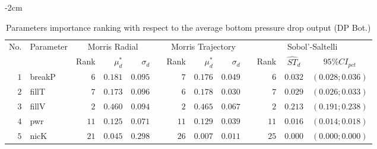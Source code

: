 \begin{table*}[!htbp]\centering
{}
\begin{adjustwidth*}{}{-2cm}
\caption{Parameters importance ranking with respect to the average bottom pressure drop output (DP Bot.)}
\label{tab:app_screening_dpbot_average}
\begin{tabular}{@{}rlrrrrrrrrrcc@{}}\toprule
\multirow{2}{*}{\footnotesize{No.}} & \multirow{2}{*}{\footnotesize{Parameter}} & \multicolumn{3}{c}{\footnotesize{Morris Radial}} & \phantom{a} & \multicolumn{3}{c}{\footnotesize{Morris Trajectory}}  &\phantom{a}& \multicolumn{3}{c}{\footnotesize{Sobol'-Saltelli}}                               \\             
                                                                                  \cmidrule{3-5}                                                   \cmidrule{7-9}                                                      \cmidrule{11-13}
                                    &                                           & \footnotesize{Rank}   & $\mu^*_d$ & $\sigma_d$   &             & \footnotesize{Rank} & $\mu^*_d$ & $\sigma_d$          &           & \footnotesize{Rank} & \footnotesize{$\hat{ST}_d$} & \footnotesize{$95\%CI_{pct}$}\\ \midrule
\footnotesize{$1 $} & \footnotesize{breakP   } & \footnotesize{$6 $} & \footnotesize{$0.181$} & \footnotesize{$0.095$} && \footnotesize{$7 $} & \footnotesize{$0.176$} & \footnotesize{$0.049$} && \footnotesize{$6 $} & \footnotesize{$0.032$} & \footnotesize{$(0.028;0.036)$} \\
\footnotesize{$2 $} & \footnotesize{fillT    } & \footnotesize{$7 $} & \footnotesize{$0.173$} & \footnotesize{$0.096$} && \footnotesize{$6 $} & \footnotesize{$0.178$} & \footnotesize{$0.030$} && \footnotesize{$7 $} & \footnotesize{$0.029$} & \footnotesize{$(0.026;0.033)$} \\
\footnotesize{$3 $} & \footnotesize{fillV    } & \footnotesize{$2 $} & \footnotesize{$0.460$} & \footnotesize{$0.094$} && \footnotesize{$2 $} & \footnotesize{$0.465$} & \footnotesize{$0.067$} && \footnotesize{$2 $} & \footnotesize{$0.213$} & \footnotesize{$(0.191;0.238)$} \\
\footnotesize{$4 $} & \footnotesize{pwr      } & \footnotesize{$11$} & \footnotesize{$0.125$} & \footnotesize{$0.071$} && \footnotesize{$11$} & \footnotesize{$0.129$} & \footnotesize{$0.039$} && \footnotesize{$11$} & \footnotesize{$0.016$} & \footnotesize{$(0.014;0.018)$} \\
\footnotesize{$5 $} & \footnotesize{nicK     } & \footnotesize{$21$} & \footnotesize{$0.045$} & \footnotesize{$0.298$} && \footnotesize{$26$} & \footnotesize{$0.007$} & \footnotesize{$0.011$} && \footnotesize{$25$} & \footnotesize{$0.000$} & \footnotesize{$(0.000;0.000)$} \\

\end{tabular}
\end{adjustwidth*}
\end{table*}
